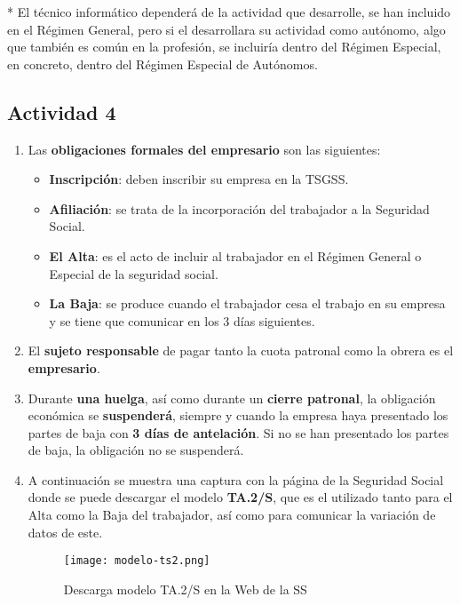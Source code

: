 * El técnico informático dependerá de la actividad que desarrolle, se han incluido en el Régimen General, pero si el desarrollara su actividad como autónomo, algo que también es común en la profesión, se incluiría dentro del Régimen Especial, en concreto, dentro del Régimen Especial de Autónomos.

\subsection{Actividad 4}

\begin{enumerate}
    \item Las \textbf{obligaciones formales del empresario} son las siguientes:
    \begin{itemize}
        \item \textbf{Inscripción}: deben inscribir su empresa en la TSGSS.
        \item \textbf{Afiliación}: se trata de la incorporación del trabajador a la Seguridad Social.
        \item \textbf{El Alta}: es el acto de incluir al trabajador en el Régimen General o Especial de la seguridad social.
        \item \textbf{La Baja}: se produce cuando el trabajador cesa el trabajo en su empresa y se tiene que comunicar en los 3 días siguientes.
    \end{itemize}

    \item El \textbf{sujeto responsable} de pagar tanto la cuota patronal como la obrera es el \textbf{empresario}.

    \item Durante \textbf{una huelga}, así como durante un \textbf{cierre patronal}, la obligación económica se \textbf{suspenderá}, siempre y cuando la empresa haya presentado los partes de baja con \textbf{3 días de antelación}. Si no se han presentado los partes de baja, la obligación no se suspenderá.

    \item A continuación se muestra una captura con la página de la Seguridad Social donde se puede descargar el modelo \textbf{TA.2/S}, que es el utilizado tanto para el Alta como la Baja del trabajador, así como para comunicar la variación de datos de este.

    \begin{figure}[H]
        \centering
        \texttt{[image: modelo-ts2.png]}
        \caption{Descarga modelo TA.2/S en la Web de la SS}
    \end{figure}
\end{enumerate}

